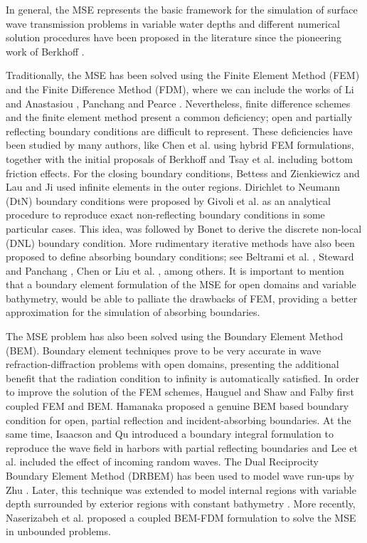 In general, the MSE represents the basic framework for the simulation of surface wave transmission problems in variable water depths and different numerical solution procedures have been proposed in the literature since the pioneering work of Berkhoff \cite{Berkhoff1972}.

Traditionally, the MSE has been solved using the Finite Element Method (FEM) \cite{Berkhoff1976} and the Finite Difference Method (FDM), where we can include the works of Li and Anastasiou \cite{Li1992}, Panchang and Pearce \cite{Panchang1991}. Nevertheless, finite difference schemes and the finite element method present a common deficiency; open and partially reflecting boundary conditions are difficult to represent. These deficiencies have been studied by many authors, like Chen et al. \cite{Chen1974,Chen1986} using hybrid FEM formulations, together with the initial proposals of Berkhoff \cite{Berkhoff1976} and Tsay et al. \cite{Tsay1983,Tsay1989} including bottom friction effects. For the closing boundary conditions, Bettess and Zienkiewicz \cite{Bettess1978} and Lau and Ji \cite{Lau1989} used infinite elements in the outer regions. Dirichlet to Neumann (DtN) boundary conditions were proposed by Givoli et al. \cite{Givoli1990,Keller1989,Givoli1991} as an analytical procedure to reproduce exact non-reflecting boundary conditions in some particular cases. This idea, was followed by Bonet \cite{Bonet2013} to derive the discrete non-local (DNL) boundary condition. More rudimentary iterative methods have also been proposed to define absorbing boundary conditions; see Beltrami et al. \cite{Beltrami2001}, Steward and Panchang \cite{Steward2001}, Chen \cite{Chen2002} or Liu et al. \cite{Liu2008}, among others. It is important to mention that a boundary element formulation of the MSE for open domains and variable bathymetry, would be able to palliate the drawbacks of FEM, providing a better approximation for the simulation of absorbing boundaries.

The MSE problem has also been solved using the Boundary Element Method (BEM). Boundary element techniques prove to be very accurate in wave refraction-diffraction problems with open domains, presenting the additional benefit that the radiation condition to infinity is automatically satisfied. In order to improve the solution of the FEM schemes, Hauguel \cite{Hauguel1978} and Shaw and Falby \cite{Shaw1978} first coupled FEM and BEM. Hamanaka \cite{Hamanaka1997} proposed a genuine BEM based boundary condition for open, partial reflection and incident-absorbing boundaries. At the same time, Isaacson and Qu \cite{Isaacson1990} introduced a boundary integral formulation to reproduce the wave field in harbors with partial reflecting boundaries and Lee et al. \cite{Lee2002,Lee2009} included the effect of incoming random waves. The Dual Reciprocity Boundary Element Method (DRBEM) has been used to model wave run-ups by Zhu \cite{Zhu1993}. Later, this technique was extended to model internal regions with variable depth surrounded by exterior regions with constant bathymetry \cite{Liu2003,Zhu2000,Zhu2009,Hsiao2009}. More recently, Naserizabeh et al. \cite{Naserizadeh2011} proposed a coupled BEM-FDM formulation to solve the MSE in unbounded problems.  

